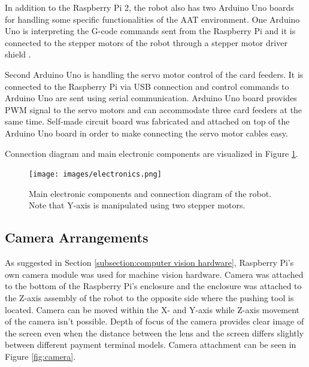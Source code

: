 In addition to the Raspberry Pi 2, the robot also has two Arduino Uno boards for handling some specific functionalities of the AAT environment. One Arduino Uno is interpreting the G-code commands sent from the Raspberry Pi and it is connected to the stepper motors of the robot through a stepper motor driver shield \citep{grbl_shield}.

Second Arduino Uno is handling the servo motor control of the card feeders. It is connected to the Raspberry Pi via USB connection and control commands to Arduino Uno are sent using serial communication. Arduino Uno board provides PWM signal to the servo motors and can accommodate three card feeders at the same time. Self-made circuit board was fabricated and attached on top of the Arduino Uno board in order to make connecting the servo motor cables easy.

Connection diagram and main electronic components are visualized in Figure \ref{fig:electronics}.

\begin{figure}[ht]
  \begin{center}
    \texttt{[image: images/electronics.png]}
    \caption{Main electronic components and connection diagram of the robot. Note that Y-axis is manipulated using two stepper motors.}
    \label{fig:electronics}
  \end{center}
\end{figure}
\FloatBarrier

\subsection{Camera Arrangements}
\label{subsection:Camera Arrangements}

As suggested in Section \ref{subsection:computer vision hardware}, Raspberry Pi's own camera module was used for machine vision hardware. Camera was attached to the bottom of the Raspberry Pi's enclosure and the enclosure was attached to the Z-axis assembly of the robot to the opposite side where the pushing tool is located. Camera can be moved within the X- and Y-axis while Z-axis movement of the camera isn't possible. Depth of focus of the camera provides clear image of the screen even when the distance between the lens and the screen differs slightly between different payment terminal models. Camera attachment can be seen in Figure \ref{fig:camera}.

